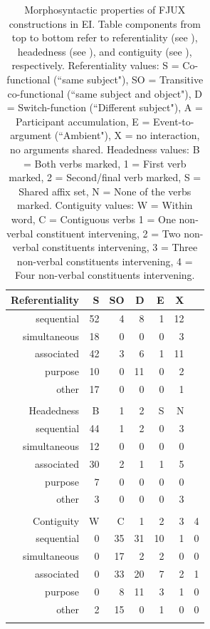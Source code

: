 \begin{table}
\centering
\begin{tabular}{rrrrrrr}
  \lsptoprule
Referentiality & S & SO & D & E & X \\ 
  \midrule
  sequential &  52 &   4 &   8 &   1 &  12 \\ 
  simultaneous &  18 &   0 &   0 &   0 &   3 \\ 
  associated &  42 &   3 &   6 &   1 &  11 \\ 
  purpose &  10 &   0 &  11 &   0 &   2 \\ 
  other &  17 &   0 &   0 &   0 &   1 \\ 
   \midrule
 \\
  \midrule
Headedness & B & 1 & 2 & S & N \\ 
  \midrule
  sequential &  44 &   1 &   2 &   0 &   3 \\ 
  simultaneous &  12 &   0 &   0 &   0 &   0 \\ 
  associated &  30 &   2 &   1 &   1 &   5 \\ 
  purpose &   7 &   0 &   0 &   0 &   0 \\ 
  other &   3 &   0 &   0 &   0 &   3 \\ 
   \midrule
 \\
  \midrule
Contiguity & W & C & 1 & 2 & 3 & 4 \\ 
  \midrule
  sequential &   0 &  35 &  31 &  10 &   1 &   0 \\ 
  simultaneous &   0 &  17 &   2 &   2 &   0 &   0 \\ 
  associated &   0 &  33 &  20 &   7 &   2 &   1 \\ 
  purpose &   0 &   8 &  11 &   3 &   1 &   0 \\ 
  other &   2 &  15 &   0 &   1 &   0 &   0 \\ 
   \lspbottomrule
\end{tabular}
\caption[Morphosyntactic properties of FJUX constructions]{Morphosyntactic properties of FJUX constructions in EI. Table components from top to bottom refer to referentiality (see ), headedness (see ), and contiguity (see ), respectively. Referentiality values: S = Co-functional (``same subject"), SO = Transitive co-functional (``same subject and object"), D = Switch-function (``Different subject"), A = Participant accumulation, E = Event-to-argument (``Ambient"), X = no interaction, no arguments shared. Headedness values: B = Both verbs marked, 1 = First verb marked, 2 = Second/final verb marked, S = Shared affix set, N = None of the verbs marked. Contiguity values: W = Within word, C = Contiguous verbs 1 = One non-verbal constituent intervening, 2 = Two non-verbal constituents intervening, 3 = Three non-verbal constituents intervening, 4 = Four non-verbal constituents intervening.}
\label{table:FJUX_formal}
\end{table}

